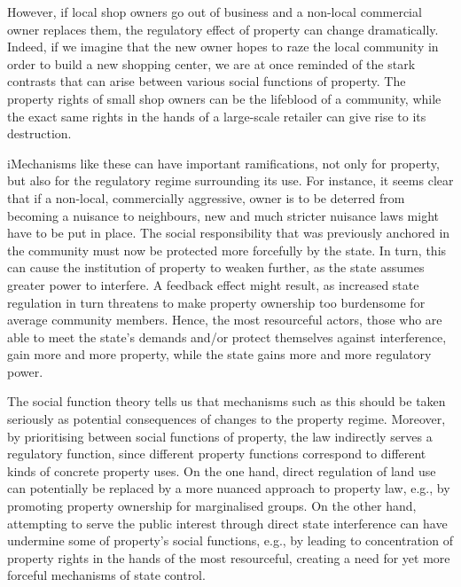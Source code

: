 However, if local shop owners go out of business and a non-local commercial owner replaces them, the  regulatory effect of property can change dramatically. %
Indeed, if we imagine that the new owner hopes to raze the local community in order to build a new shopping center, we are at once reminded of the stark contrasts that can arise between various social functions of property. The property rights of small shop owners can be the lifeblood of a community, while the exact same rights in the hands of a large-scale retailer can give rise to its destruction.


iMechanisms like these can have important ramifications, not only for property, but also for the regulatory regime surrounding its use. For instance, it seems clear that if a non-local, commercially aggressive, owner is to be deterred from becoming a nuisance to neighbours, new and much stricter nuisance laws might have to be put in place. The social responsibility that was previously anchored in the community must now be protected more forcefully by the state. In turn, this can cause the institution of property to weaken further, as the state assumes greater power to interfere. A feedback effect might result, as increased state regulation in turn threatens to make property ownership too burdensome for average community members. Hence, the most resourceful actors, those who are able to meet the state's demands and/or protect themselves against interference, gain more and more property, while the state gains more and more regulatory power.

The social function theory tells us that mechanisms such as this should be taken seriously as potential consequences of changes to the property regime. Moreover, by prioritising between social functions of property, the law indirectly serves a regulatory function, since different property functions correspond to different kinds of concrete property uses. On the one hand, direct regulation of land use can potentially be replaced by a more nuanced approach to property law, e.g., by promoting property ownership for marginalised groups. On the other hand, attempting to serve the public interest through direct state interference can have undermine some of property's social functions, e.g., by leading to concentration of property rights in the hands of the most resourceful, creating a need for yet more forceful mechanisms of state control.

